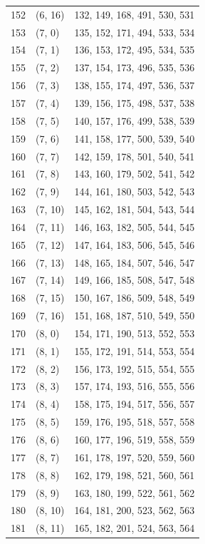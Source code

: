\documentclass{article}
\begin{document}
\begin{longtable}{lll}
  152 & (6, 16) & 132, 149, 168, 491, 530, 531 \\
  153 & (7, 0) & 135, 152, 171, 494, 533, 534 \\
  154 & (7, 1) & 136, 153, 172, 495, 534, 535 \\
  155 & (7, 2) & 137, 154, 173, 496, 535, 536 \\
  156 & (7, 3) & 138, 155, 174, 497, 536, 537 \\
  157 & (7, 4) & 139, 156, 175, 498, 537, 538 \\
  158 & (7, 5) & 140, 157, 176, 499, 538, 539 \\
  159 & (7, 6) & 141, 158, 177, 500, 539, 540 \\
  160 & (7, 7) & 142, 159, 178, 501, 540, 541 \\
  161 & (7, 8) & 143, 160, 179, 502, 541, 542 \\
  162 & (7, 9) & 144, 161, 180, 503, 542, 543 \\
  163 & (7, 10) & 145, 162, 181, 504, 543, 544 \\
  164 & (7, 11) & 146, 163, 182, 505, 544, 545 \\
  165 & (7, 12) & 147, 164, 183, 506, 545, 546 \\
  166 & (7, 13) & 148, 165, 184, 507, 546, 547 \\
  167 & (7, 14) & 149, 166, 185, 508, 547, 548 \\
  168 & (7, 15) & 150, 167, 186, 509, 548, 549 \\
  169 & (7, 16) & 151, 168, 187, 510, 549, 550 \\
  170 & (8, 0) & 154, 171, 190, 513, 552, 553 \\
  171 & (8, 1) & 155, 172, 191, 514, 553, 554 \\
  172 & (8, 2) & 156, 173, 192, 515, 554, 555 \\
  173 & (8, 3) & 157, 174, 193, 516, 555, 556 \\
  174 & (8, 4) & 158, 175, 194, 517, 556, 557 \\
  175 & (8, 5) & 159, 176, 195, 518, 557, 558 \\
  176 & (8, 6) & 160, 177, 196, 519, 558, 559 \\
  177 & (8, 7) & 161, 178, 197, 520, 559, 560 \\
  178 & (8, 8) & 162, 179, 198, 521, 560, 561 \\
  179 & (8, 9) & 163, 180, 199, 522, 561, 562 \\
  180 & (8, 10) & 164, 181, 200, 523, 562, 563 \\
  181 & (8, 11) & 165, 182, 201, 524, 563, 564 \\

\end{longtable}
\end{document}
